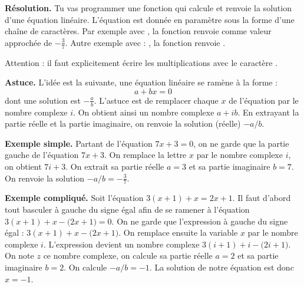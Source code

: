 \documentclass[11pt,class=report,crop=false]{standalone}
\begin{document}

\begin{activite}


\bigskip

\textbf{Résolution.}
Tu vas programmer une fonction 
qui calcule et renvoie la solution d'une équation linéaire. 
L'équation est donnée en paramètre sous la forme d'une chaîne de caractères. Par exemple
avec , la fonction renvoie  comme valeur approchée 
de $-\frac37$.
Autre exemple avec : , la fonction renvoie .

Attention : il faut explicitement écrire les multiplications avec le caractère \og{}\ci{*}\fg{}.


\bigskip

\textbf{Astuce.}
L'idée est la suivante, une équation linéaire se ramène à la forme :
$$a + bx = 0$$
dont une solution est $-\frac{a}{b}$.
L'astuce est de remplacer chaque \og{}$x$\fg{} de l'équation par le nombre complexe $i$. On obtient ainsi un nombre complexe $a+ib$. En extrayant la partie réelle et la partie imaginaire, on renvoie la solution (réelle) $-a/b$.

\bigskip

\textbf{Exemple simple.}
Partant de l'équation $7x+3 = 0$, on ne garde que la partie gauche de l'équation $7x+3$. On remplace la lettre $x$ par le nombre complexe $i$, on obtient 
$7i+3$. On extrait sa partie réelle $a=3$ et sa partie imaginaire $b=7$. On renvoie la solution $-a/b = -\frac37$.

\bigskip

\textbf{Exemple compliqué.}
Soit l'équation $3(x+1) + x = 2x+1$. Il faut d'abord tout basculer à gauche du signe égal afin de se ramener à l'équation $3(x+1) + x - \big(2x+1 \big) = 0$.
On ne garde que l'expression à gauche du signe égal : 
$3(x+1) + x - \big(2x+1 \big)$.
On remplace ensuite la variable $x$ par le nombre complexe $i$.
L'expression devient un nombre complexe $3(i+1) + i - \big(2i+1 \big)$.
On note $z$ ce nombre complexe, on calcule sa partie réelle $a = 2$  et sa partie imaginaire $b = 2$. On calcule $-a/b = -1$. La solution de notre équation est donc $x = -1$.



\end{activite}
\end{document}
